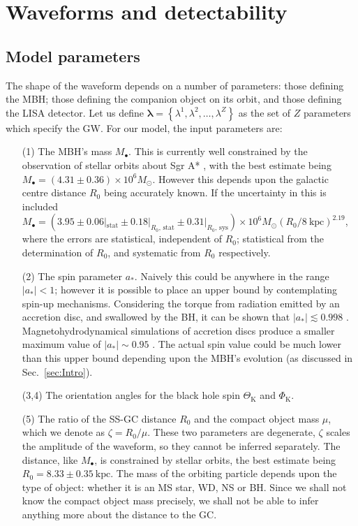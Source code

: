\documentclass[useAMS,usedcolumn,usegraphicx,usenatbib]{mn2e}
\newcommand{\secref}[1]{Sec.~\ref{sec:#1}}
\newcommand{\units}[1]{\ensuremath{~\mathrm{#1}}}
\newcommand{\sub}[1]{\ensuremath{_\mathrm{#1}}}
\begin{document}
\section{Waveforms and detectability}\label{sec:Waveforms}

\subsection{Model parameters}

The shape of the waveform depends on a number of parameters: those defining the MBH; those defining the companion object on its orbit, and those defining the LISA detector. Let us define $\boldsymbol{\lambda} = \left\{\lambda^1, \lambda^2, \ldots, \lambda^Z\right\}$ as the set of $Z$ parameters which specify the GW. For our model, the input parameters are:
\begin{enumerate}
\item[(1)] The MBH's mass $M_\bullet$. This is currently well constrained by the observation of stellar orbits about Sgr A* \citep{Ghez2008, Gillessen2009}, with the best estimate being $M_\bullet = (4.31 \pm 0.36) \times 10^6 M_\odot$. However this depends upon the galactic centre distance $R_0$ being accurately known. If the uncertainty in this is included $M_\bullet = (3.95 \pm 0.06|\sub{stat} \pm 0.18|_{R_0, \, \mathrm{stat}} \pm  0.31|_{R_0, \, \mathrm{sys}}) \times 10^6 M_\odot (R_0 / 8\units{kpc})^{2.19}$, where the errors are statistical, independent of $R_0$; statistical from the determination of $R_0$, and systematic from $R_0$ respectively.
\item[(2)] The spin parameter $a_\ast$. Naively this could be anywhere in the range $|a_\ast| < 1$; however it is possible to place an upper bound by contemplating spin-up mechanisms. Considering the torque from radiation emitted by an accretion disc, and swallowed by the BH, it can be shown that $|a_\ast| \lesssim 0.998$ \citep{Thorne1974}. Magnetohydrodynamical simulations of accretion discs produce a smaller maximum value of $|a_\ast| \sim 0.95$ \citep{Gammie2004}. The actual spin value could be much lower than this upper bound depending upon the MBH's evolution (as discussed in \secref{Intro}).
\item[(3,4)] The orientation angles for the black hole spin $\Theta\sub{K}$ and $\Phi\sub{K}$.
\item[(5)] The ratio of the SS-GC distance $R_0$ and the compact object mass $\mu$, which we denote as $\zeta = R_0/\mu$. These two parameters are degenerate, $\zeta$ scales the amplitude of the waveform, so they cannot be inferred separately. The distance, like $M_\bullet$, is constrained by stellar orbits, the best estimate being \citep{Gillessen2009} $R_0 = 8.33 \pm 0.35\units{kpc}$. The mass of the orbiting particle depends upon the type of object: whether it is an MS star, WD, NS or BH. Since we shall not know the compact object mass precisely, we shall not be able to infer anything more about the distance to the GC.

\end{enumerate}
\end{document}
